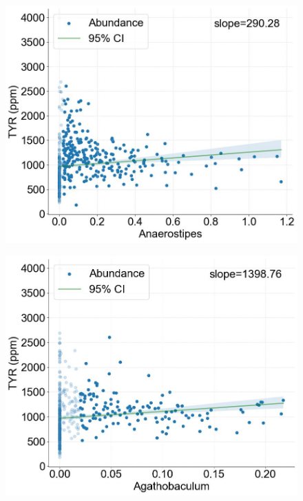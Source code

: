 \documentclass[12pt]{article}
\begin{document}
\begin{figure}[H]
    \centering
    \begin{minipage}{0.48\linewidth}
        \centering
        \includegraphics[width=\linewidth, height=0.8\linewidth]{pic/genus/genus1.jpg}
               \label{fig:image1}
    \end{minipage}
    \hfill
    \begin{minipage}{0.48\linewidth}
        \centering
        \includegraphics[width=\linewidth, height=0.8\linewidth]{pic/genus/genus2.jpg}
        \label{fig:fig:image2}
    \end{minipage}
    

\end{figure}
\end{document}
